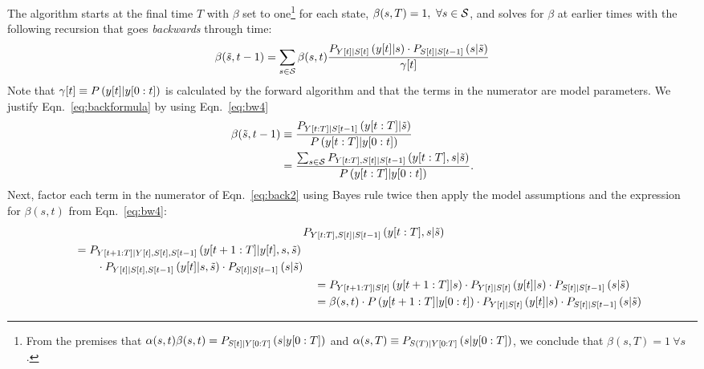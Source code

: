 The algorithm starts at the final time $T$ with $\beta$ set to
one\footnote{From the premises that $\alpha(s,t) \beta(s,t) =
  P_{{S}{[t]}|Y[0:T]} \left(s|y[0:T] \right)$ and
  $\alpha(s,T) \equiv P_{S(T)|Y[0:T]}\left(s |y[0:T]
  \right)$, we conclude that $\beta(s,T) = 1 ~\forall s$.} %
for each state, $\beta(s,T) = 1,~\forall s \in \states$, and solves
for $\beta$ at earlier times with the following recursion that goes
\emph{backwards} through time:
\begin{equation}
  \label{eq:backformula}
  \beta({\tilde s},t-1) = \sum_{s\in\states} \beta(s,t)
  \frac{ P_{\ti{Y}{t}|\ti{S}{t}}
    \left(\ti{y}{t}|s \right) \cdot P_{\ti{S}{t}|\ti{S}{t-1}}
    \left(s|{\tilde s} \right)} {\ti{\gamma}{t}}
\end{equation}
Note that ${{\gamma}{[t]} \equiv P \left( {y}{[t]} |
    y[0:t]\right)}$ is calculated by the forward algorithm and
that the terms in the numerator are model parameters.  We justify
Eqn.~\eqref{eq:backformula} by using Eqn.~\eqref{eq:bw4}
\begin{align}
  \beta({\tilde s},t-1) & \equiv \frac{P_{\ts{Y}{t}{T}|\ti{S}{t-1}}
    \left(\ts{y}{t}{T}|{\tilde s} \right)}
  {P \left(\ts{y}{t}{T}|\ts{y}{0}{t} \right)} \\
  \mlabel{eq:back2}
  &= \frac{\sum_{s\in\states} P_{\ts{Y}{t}{T},\ti{S}{t}|\ti{S}{t-1}}
    \left(\ts{y}{t}{T},s|{\tilde s} \right)} {P
    \left(\ts{y}{t}{T}|\ts{y}{0}{t} \right)}.
\end{align}
Next, factor each term in the numerator of Eqn.~\eqref{eq:back2} using
Bayes rule twice then apply the model assumptions and the expression
for $\beta(s,t)$ from Eqn.~\eqref{eq:bw4}:
\begin{align*}
  & P_{Y[t:T],{S}{[t]}|{S}{[t-1]}}\left( y[t:T],s|{\tilde s} \right)\\
  \begin{split}
    &\quad= P_{Y[t+1:T]|{Y}{[t]},{S}{[t]},{S}{[t-1]}}
       \left(y[t+1:T]|{y}{[t]},s,{\tilde s} \right)\\
    &\quad\qquad \cdot P_{{Y}{[t]}|{S}{[t]},{S}{[t-1]}} \left({y}{[t]}|s,{\tilde s}
       \right)\cdot P_{{S}{[t]}|{S}{[t-1]}} \left(s|{\tilde s} \right)
  \end{split}\\
  &\quad= P_{Y[t+1:T]|{S}{[t]}} \left(y[t+1:T]|s\right)
           \cdot P_{{Y}{[t]}|{S}{[t]}} \left({y}{[t]}|s \right) \cdot
            P_{{S}{[t]}|{S}{[t-1]}} \left(s|{\tilde s} \right) \\
  &\quad= \beta(s,t) \cdot P \left(y[t+1:T]|y[0:t] \right)
           \cdot P_{{Y}{[t]}|{S}{[t]}} \left({y}{[t]}|s \right) \cdot
            P_{{S}{[t]}|{S}{[t-1]}} \left(s|{\tilde s} \right)
\end{align*}
